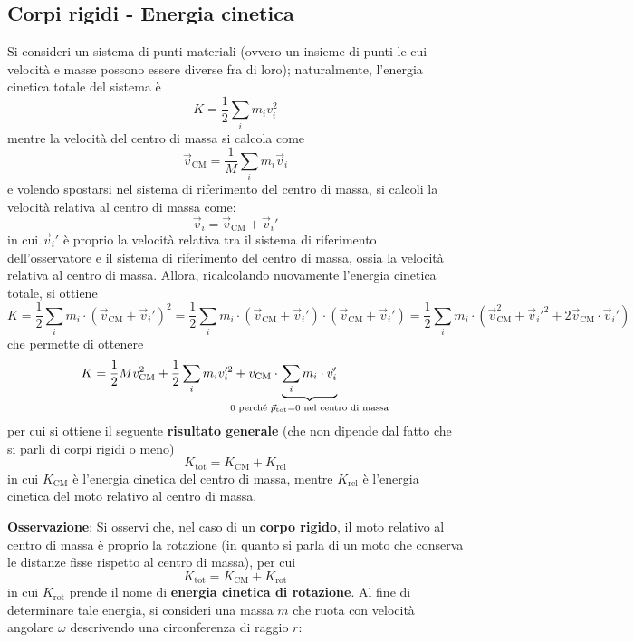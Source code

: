 \documentclass[a4paper]{extarticle}
\begin{document}
\subsection{Corpi rigidi - Energia cinetica}
Si consideri un sistema di punti materiali (ovvero un insieme di punti le cui velocità e masse possono essere diverse fra di loro); naturalmente, l'energia cinetica totale del sistema è
\[K=\frac{1}{2}\sum_i m_i v_i^2\]
mentre la velocità del centro di massa si calcola come
\[\vec v_{\text{CM}}=\frac{1}{M} \sum_i m_i \vec v_i\]
e volendo spostarsi nel sistema di riferimento del centro di massa, si calcoli la velocità relativa al centro di massa come:
\[\vec v_i = \vec v_{\text{CM}} + \vec v_i'\]
in cui $\vec v_i'$ è proprio la velocità relativa tra il sistema di riferimento dell'osservatore e il sistema di riferimento del centro di massa, ossia la velocità relativa al centro di massa. Allora, ricalcolando nuovamente l'energia cinetica totale, si ottiene
\[K=\frac{1}{2}\sum_i m_i \cdot \left(\vec v_{\text{CM}} + \vec v_{i}'\right)^2=\frac{1}{2}\sum_i m_i \cdot \left(\vec v_{\text{CM}} + \vec v_{i}'\right) \cdot \left(\vec v_{\text{CM}} + \vec v_{i}'\right) = \frac{1}{2}\sum_i m_i \cdot \left(\vec v_{\text{CM}}^2 + \vec v_{i}'^2 + 2 \vec v_{\text{CM}} \cdot \vec v_i'\right)\]
che permette di ottenere
\[K=\frac{1}{2}M v_{\text{CM}}^2 + \frac{1}{2}\sum_i m_i v_i'^2 + \vec v_{\text{CM}} \cdot \hspace{-4em} \underbrace{\sum_i m_i \cdot \vec v_i'}_{0 \text{ perché } \vec p_{\text{tot}}=0 \text{ nel centro di massa}}\]
per cui si ottiene il seguente \textbf{risultato generale} (che non dipende dal fatto che si parli di corpi rigidi o meno)
\[\boxed{K_{\text{tot}}=K_{\text{CM}}+K_{\text{rel}}}\]
in cui $K_{\text{CM}}$ è l'energia cinetica del centro di massa, mentre $K_{\text{rel}}$ è l'energia cinetica del moto relativo al centro di massa.

\vspace{1em}
\noindent
\textbf{Osservazione}: Si osservi che, nel caso di un \textbf{corpo rigido}, il moto relativo al centro di massa è proprio la rotazione (in quanto si parla di un moto che conserva le distanze fisse rispetto al centro di massa), per cui
\[\boxed{K_{\text{tot}}=K_{\text{CM}}+K_{\text{rot}}}\]
in cui $K_{\text{rot}}$ prende il nome di \textbf{energia cinetica di rotazione}. Al fine di determinare tale energia, si consideri una massa $m$ che ruota con velocità angolare $\omega$ descrivendo una circonferenza di raggio $r$:

\begin{figure}[H]
  \centering
\end{figure}
\end{document}
